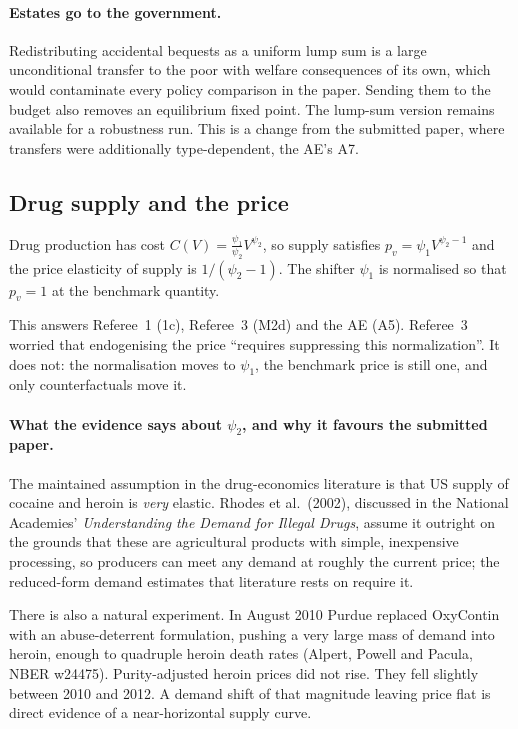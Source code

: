\documentclass[11pt]{article}
\begin{document}
\paragraph{Estates go to the government.} Redistributing accidental bequests as a
uniform lump sum is a large unconditional transfer to the poor with welfare
consequences of its own, which would contaminate every policy comparison in the
paper. Sending them to the budget also removes an equilibrium fixed point. The
lump-sum version remains available for a robustness run. This is a change from
the submitted paper, where transfers were additionally type-dependent, the
AE's A7.

\subsection{Drug supply and the price}

Drug production has cost $C(V)=\frac{\psi_1}{\psi_2}V^{\psi_2}$, so supply
satisfies $p_v=\psi_1V^{\psi_2-1}$ and the price elasticity of supply is
$1/(\psi_2-1)$. The shifter $\psi_1$ is normalised so that $p_v=1$ at the
benchmark quantity.

This answers Referee~1 (1c), Referee~3 (M2d) and the AE (A5). Referee~3 worried
that endogenising the price ``requires suppressing this normalization''. It does
not: the normalisation moves to $\psi_1$, the benchmark price is still one, and
only counterfactuals move it.

\paragraph{What the evidence says about $\psi_2$, and why it favours the
submitted paper.} The maintained assumption in the drug-economics literature is
that US supply of cocaine and heroin is \emph{very} elastic. Rhodes et al.\
(2002), discussed in the National Academies' \emph{Understanding the Demand for
Illegal Drugs}, assume it outright on the grounds that these are agricultural
products with simple, inexpensive processing, so producers can meet any demand at
roughly the current price; the reduced-form demand estimates that literature
rests on require it.

There is also a natural experiment. In August 2010 Purdue replaced OxyContin
with an abuse-deterrent formulation, pushing a very large mass of demand into
heroin, enough to quadruple heroin death rates (Alpert, Powell and Pacula,
NBER w24475). Purity-adjusted heroin prices did not rise. They fell slightly
between 2010 and 2012. A demand shift of that magnitude leaving price flat is
direct evidence of a near-horizontal supply curve.
\end{document}
